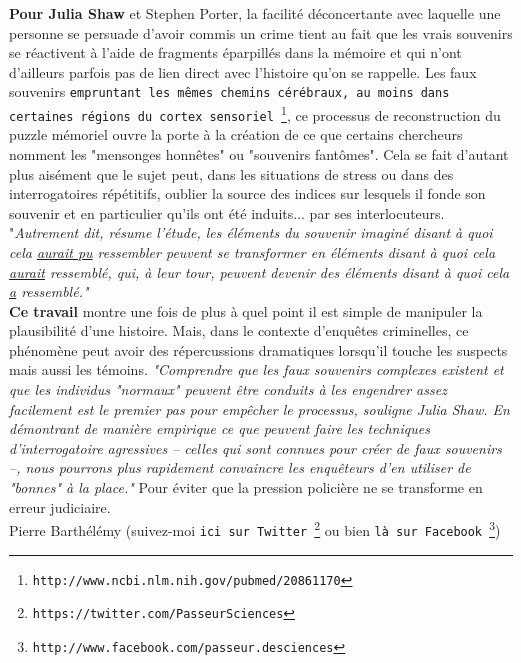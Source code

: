 \documentclass[11pt,twoside,a4paper]{article}
\begin{document}
\textbf{Pour Julia Shaw} et Stephen Porter, la facilit{\'e} d{\'e}concertante avec laquelle une personne se persuade d'avoir commis un crime tient au fait que les vrais souvenirs se r{\'e}activent {\`a} l'aide de fragments {\'e}parpill{\'e}s dans la m{\'e}moire et qui n'ont d'ailleurs parfois pas de lien direct avec l'histoire qu'on se rappelle. Les faux souvenirs \texttt{empruntant les m{\^e}mes chemins c{\'e}r{\'e}braux, au moins dans certaines r{\'e}gions du cortex sensoriel~\footnote{\texttt{http://www.ncbi.nlm.nih.gov/pubmed/20861170}}}, ce processus de reconstruction du puzzle m{\'e}moriel ouvre la porte {\`a} la cr{\'e}ation de ce que certains chercheurs nomment les "mensonges honn{\^e}tes" ou "souvenirs fant{\^o}mes". Cela se fait d'autant plus ais{\'e}ment que le sujet peut, dans les situations de stress ou dans des interrogatoires r{\'e}p{\'e}titifs, oublier la source des indices sur lesquels il fonde son souvenir et en particulier qu'ils ont {\'e}t{\'e} induits... par ses interlocuteurs. "\emph{Autrement dit, r{\'e}sume l'{\'e}tude, les {\'e}l{\'e}ments du souvenir imagin{\'e} disant {\`a} quoi cela \underline{aurait pu} ressembler peuvent se transformer en {\'e}l{\'e}ments disant {\`a} quoi cela \underline{aurait} ressembl{\'e}, qui, {\`a} leur tour, peuvent devenir des {\'e}l{\'e}ments disant {\`a} quoi cela \underline{a} ressembl{\'e}."}~\\

\textbf{Ce travail} montre une fois de plus {\`a} quel point il est simple de manipuler la plausibilit{\'e} d'une histoire. Mais, dans le contexte d'enqu{\^e}tes criminelles, ce ph{\'e}nom{\`e}ne peut avoir des r{\'e}percussions dramatiques lorsqu'il touche les suspects mais aussi les t{\'e}moins. \emph{"Comprendre que les faux souvenirs complexes existent et que les individus "normaux" peuvent {\^e}tre conduits {\`a} les engendrer assez facilement est le premier pas pour emp{\^e}cher le processus, souligne Julia Shaw. En d{\'e}montrant de mani{\`e}re empirique ce que peuvent faire les techniques d'interrogatoire agressives -- celles qui sont connues pour cr{\'e}er de faux souvenirs –, nous pourrons plus rapidement convaincre les enqu{\^e}teurs d'en utiliser de "bonnes" {\`a} la place."} Pour {\'e}viter que la pression polici{\`e}re ne se transforme en erreur judiciaire.~\\

Pierre Barth{\'e}l{\'e}my (suivez-moi \texttt{ici sur Twitter~\footnote{\texttt{https://twitter.com/PasseurSciences}}} ou bien \texttt{l{\`a} sur Facebook~\footnote{\texttt{http://www.facebook.com/passeur.desciences}}})~\\
\end{document}
